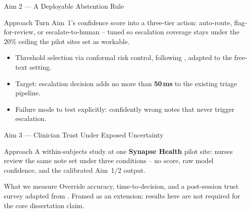 \begin{frame}{Aim 2 --- A Deployable Abstention Rule}
  \begin{navybox}{Approach}
    Turn Aim~1's confidence score into a three-tier action: auto-route,
    flag-for-review, or escalate-to-human -- tuned so escalation coverage
    stays under the 20\% ceiling the pilot sites set as workable.
  \end{navybox}
  \par\vspace{4pt}
  \begin{itemize}[leftmargin=1.4em, itemsep=2pt]
    \small
    \item[\faChartLine] Threshold selection via conformal risk control,
      following \cite{reyes2021conformal}, adapted to the free-text
      setting.
    \item[\faClock] Target: escalation decision adds no more than
      \textbf{50\,ms} to the existing triage pipeline.
    \item[\faExclamationTriangle] Failure mode to test explicitly:
      confidently wrong notes that never trigger escalation.
  \end{itemize}
\end{frame}

\begin{frame}{Aim 3 --- Clinician Trust Under Exposed Uncertainty}
  \begin{navybox}{Approach}
    A within-subjects study at one \textbf{Synapse Health} pilot site:
    nurses review the same note set under three conditions --
    no score, raw model confidence, and the calibrated Aim~1/2 output.
  \end{navybox}
  \par\vspace{6pt}
  \begin{tealbox}{What we measure}
    \footnotesize
    Override accuracy, time-to-decision, and a post-session trust survey
    adapted from \cite{haddad2022trust}. Framed as an extension: results
    here are not required for the core dissertation claim.
  \end{tealbox}
\end{frame}
